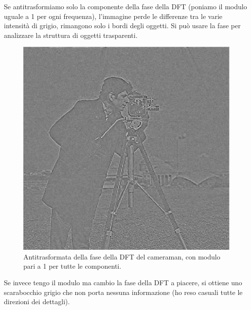 \documentclass[a4paper,11pt]{article}
\begin{document}
Se antitrasformiamo solo la componente della fase della DFT (poniamo il modulo uguale a 1 per ogni frequenza), l'immagine perde le differenze
tra le varie intensità di grigio, rimangono solo i bordi degli oggetti. Si può usare la fase per analizzare la struttura di oggetti trasparenti.

\renewcommand{\thefigure}{6.3}
\begin{figure}[!h]
  \centering
    \includegraphics[scale=0.4]{images/6/cameraman_phase_only.png}
    \caption{Antitrasformata della fase della DFT del cameraman, con modulo pari a 1 per tutte le componenti.}
\end{figure}

Se invece tengo il modulo ma cambio la fase della DFT a piacere, si ottiene uno scarabocchio grigio che non porta nessuna informazione (ho reso casuali tutte le direzioni dei dettagli).

\newpage
\end{document}

